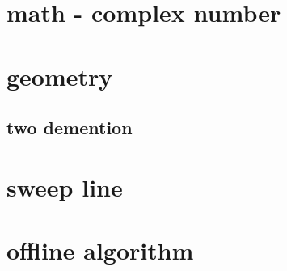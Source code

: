 \documentclass[UTF8, a4paper, titlepage, twoside]{ctexart}
\begin{document}
\section{math - complex number}


\section{geometry}
\subsection{ two demention }


\section{sweep line}

\section{offline algorithm}
\end{document}
